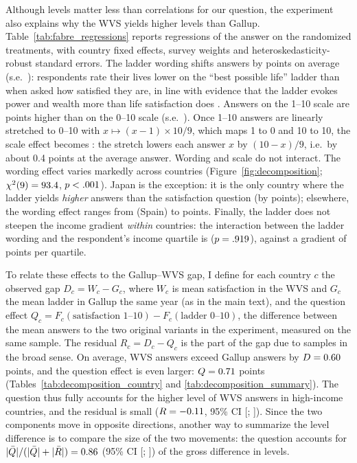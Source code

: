 \documentclass[11pt]{article}
\begin{document}
Although levels matter less than correlations for our question, the experiment also explains why the WVS yields higher levels than Gallup. Table~\ref{tab:fabre_regressions} reports regressions of the answer on the randomized treatments, with country fixed effects, survey weights and heteroskedasticity-robust standard errors. The ladder wording shifts answers by \effectLadder points on average (s.e.\ \seLadder): respondents rate their lives lower on the ``best possible life'' ladder than when asked how satisfied they are, in line with evidence that the ladder evokes power and wealth more than life satisfaction does \citep{nilsson_cantril_2024}. Answers on the 1--10 scale are \effectScale points higher than on the 0--10 scale (s.e.\ \seScale). Once 1--10 answers are linearly stretched to 0--10 with $x \mapsto (x-1) \times 10/9$, which maps 1 to 0 and 10 to 10, the scale effect becomes \effectScaleZeroTen: the stretch lowers each answer $x$ by $(10-x)/9$, i.e.\ by about 0.4 points at the average answer. Wording and scale do not interact. The wording effect varies markedly across countries (Figure~\ref{fig:decomposition}; $\chi^2(9) = 93.4$, $p < .001$). Japan is the exception: it is the only country where the ladder yields \textit{higher} answers than the satisfaction question (by \wordingJPN points); elsewhere, the wording effect ranges from \wordingMin (Spain) to \wordingMaxNegative points. Finally, the ladder does not steepen the income gradient \textit{within} countries: the interaction between the ladder wording and the respondent's income quartile is \interactionLadderIncome ($p = .919$), against a gradient of \gradientIncomeSatisfaction points per quartile.

To relate these effects to the Gallup--WVS gap, I define for each country $c$ the observed gap $D_c = W_c - G_c$, where $W_c$ is mean satisfaction in the WVS and $G_c$ the mean ladder in Gallup the same year (as in the main text), and the question effect $Q_c = F_c(\text{satisfaction 1--10}) - F_c(\text{ladder 0--10})$, the difference between the mean answers to the two original variants in the experiment, measured on the same sample. The residual $R_c = D_c - Q_c$ is the part of the gap due to samples in the broad sense. On average, WVS answers exceed Gallup answers by $D = 0.60$ points, and the question effect is even larger: $Q = 0.71$ points (Tables~\ref{tab:decomposition_country} and \ref{tab:decomposition_summary}). The question thus fully accounts for the higher level of WVS answers in high-income countries, and the residual is small ($R = -0.11$, 95\% CI [\decompLowMeanResidual; \decompHighMeanResidual]). Since the two components move in opposite directions, another way to summarize the level difference is to compare the size of the two movements: the question accounts for $|\bar Q|/(|\bar Q|+|\bar R|) = 0.86$ (95\% CI [\decompLowShareAbsQuestion; \decompHighShareAbsQuestion]) of the gross difference in levels.
\end{document}
